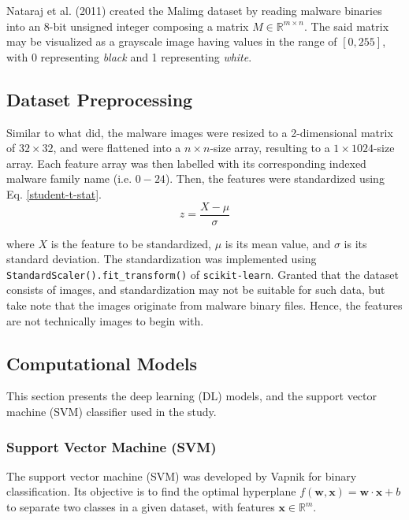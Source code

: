 \documentclass[sigconf]{acmart}
\renewcommand{\vec}[1]{\mathbf{#1}}
\begin{document}
Nataraj et al. (2011)\cite{nataraj2011malware} created the Malimg dataset by reading malware binaries into an 8-bit unsigned integer composing a matrix $M \in \mathbb{R}^{m \times n}$. The said matrix may be visualized as a grayscale image having values in the range of $[0, 255]$, with 0 representing \textit{black} and 1 representing \textit{white}.

\subsection{Dataset Preprocessing}
Similar to what \cite{garcia2016random} did, the malware images were resized to a 2-dimensional matrix of $32 \times 32$, and were flattened into a $n \times n$-size array, resulting to a $1 \times 1024$-size array. Each feature array was then labelled with its corresponding indexed malware family name (i.e. $0-24$). Then, the features were standardized using Eq. \ref{student-t-stat}.
\begin{equation}\label{student-t-stat}
z=\dfrac{X - \mu}{\sigma}
\end{equation}

where $X$ is the feature to be standardized, $\mu$ is its mean value, and $\sigma$ is its standard deviation. The standardization was implemented using \texttt{StandardScaler().fit\_transform()} of \texttt{scikit-learn}\cite{scikit-learn}. Granted that the dataset consists of images, and standardization may not be suitable for such data, but take note that the images originate from malware binary files. Hence, the features are not technically images to begin with.

\subsection{Computational Models}\label{computational-models}
This section presents the deep learning (DL) models, and the support vector machine (SVM) classifier used in the study.

\subsubsection{Support Vector Machine (SVM)}\label{svm}
The support vector machine (SVM) was developed by Vapnik\cite{Cortes} for binary classification. Its objective is to find the optimal hyperplane $f(\vec{w}, \vec{x}) = \vec{w} \cdot \vec{x} + b$ to separate two classes in a given dataset, with features $\vec{x} \in \mathbb{R}^{m}$.
\end{document}
